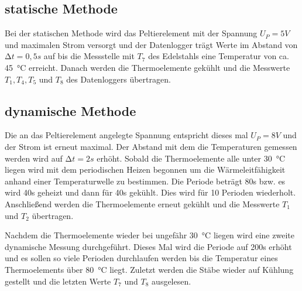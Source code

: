 \subsection{statische Methode}
Bei der statischen Methode wird das Peltierelement mit der Spannung $U_P =5V$
und maximalen Strom versorgt und der Datenlogger trägt Werte im Abstand
 von $\increment t = 0,5 s$ auf bis die Messstelle  mit $T_7$ des Edelstahls
eine Temperatur von ca. \SI{45}{\degreeCelsius} erreicht. Danach werden die
Thermoelemente gekühlt und die Messwerte $T_1, T_4, T_5$ und $T_8$
des Datenloggers übertragen.

\subsection{dynamische Methode}
Die an das Peltierelement angelegte Spannung entspricht dieses mal $U_P = 8V$
und der Strom ist erneut maximal. Der Abstand mit dem die Temperaturen
gemessen werden wird auf $\increment t = 2s$ erhöht.
Sobald die Thermoelemente alle unter \SI{30}{\degreeCelsius} liegen wird
mit dem periodischen Heizen begonnen um die Wärmeleitfähigkeit anhand
einer Temperaturwelle zu bestimmen. Die Periode beträgt 80s bzw. es wird
40s geheizt und dann für 40s gekühlt. Dies wird für 10 Perioden wiederholt.
Anschließend werden die Thermoelemente erneut gekühlt und die Messwerte
$T_1$ und $T_2$ übertragen.

Nachdem die Thermoelemente wieder bei ungefähr \SI{30}{\degreeCelsius}
liegen wird eine zweite dynamische Messung durchgeführt. Dieses Mal wird
die Periode auf 200s erhöht und es sollen so viele Perioden durchlaufen
werden bis die Temperatur eines Thermoelements über \SI{80}{\degreeCelsius}
liegt. Zuletzt werden die Stäbe wieder auf Kühlung gestellt und die letzten
Werte $T_7$ und $T_8$ ausgelesen.
